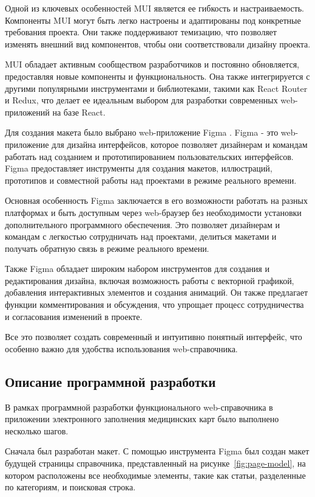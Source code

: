 Одной из ключевых особенностей MUI является ее гибкость и настраиваемость. Компоненты MUI могут быть легко настроены и адаптированы под конкретные требования проекта. Они также поддерживают темизацию, что позволяет изменять внешний вид компонентов, чтобы они соответствовали дизайну проекта.

MUI обладает активным сообществом разработчиков и постоянно обновляется, предоставляя новые компоненты и функциональность. Она также интегрируется с другими популярными инструментами и библиотеками, такими как React Router и Redux, что делает ее идеальным выбором для разработки современных web-приложений на базе React.

Для создания макета было выбрано web-приложение Figma \cite{Figma}. Figma - это web-приложение для дизайна интерфейсов, которое позволяет дизайнерам и командам работать над созданием и прототипированием пользовательских интерфейсов. Figma предоставляет инструменты для создания макетов, иллюстраций, прототипов и совместной работы над проектами в режиме реального времени.

Основная особенность Figma заключается в его возможности работать на разных платформах и быть доступным через web-браузер без необходимости установки дополнительного программного обеспечения. Это позволяет дизайнерам и командам с легкостью сотрудничать над проектами, делиться макетами и получать обратную связь в режиме реального времени.

Также Figma обладает широким набором инструментов для создания и редактирования дизайна, включая возможность работы с векторной графикой, добавления интерактивных элементов и создания анимаций. Он также предлагает функции комментирования и обсуждения, что упрощает процесс сотрудничества и согласования изменений в проекте.

Все это позволяет создать современный и интуитивно понятный интерфейс, что особенно важно для удобства использования web-справочника.

\subsection{Описание программной разработки}

В рамках программной разработки функционального web-справочника в приложении электронного заполнения медицинских карт было выполнено несколько шагов.

Сначала был разработан макет. С помощью инструмента Figma был создан макет будущей страницы справочника, представленный на рисунке~\ref{fig:page-model}, на котором расположены все необходимые элементы, такие как статьи, разделенные по категориям, и поисковая строка.

